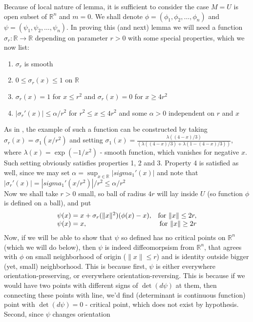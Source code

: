 \documentclass[8pt]{article} %
\newcommand{\norm}[1]{\|#1\|}
\newenvironment{proof}[1][Proof]{\begin{trivlist}
\item[\hskip \labelsep {\bfseries #1}]}{\qed\end{trivlist}}
\newcommand{\qed}{\nobreak \ifvmode \relax \else
\ifdim\lastskip<1.5em \hskip-\lastskip
\hskip1.5em plus0em minus0.5em \fi \nobreak
  \vrule height0.75em width0.5em depth0.25em\fi}
\begin{document}
\begin{proof}
	Because of local nature of lemma, it is sufficient to consider the case $M=U$ is open subset of $\mathbb{R}^n$ and $m=0$. We shall denote $\phi=(\phi_1,\phi_2,\dots,\phi_n)$ and $\psi=(\psi_1,\psi_2,\dots,\psi_n)$.
	In proving this (and next) lemma we will need a function $\sigma_r:\mathbb{R}\rightarrow\mathbb{R}$
	depending on parameter $r>0$
with some special properties, which we now list:
\begin{enumerate}\label{sigma_r_prop}
	\item{$\sigma_r$ is smooth}
	\item{$0\leq \sigma_r(x)\leq 1$ on $\mathbb{R}$}
	\item{$\sigma_r(x)=1$ for $x\leq r^2$ and $\sigma_r(x)=0$ for $x\geq 4r^2$}
	\item{$|\sigma_r'(x)|\leq \alpha/r^2$ for $r^2\leq x\leq 4r^2$ and some $\alpha>0$ independent on $r$ and $x$}
\end{enumerate}
As in \cite{diffTopo}, the example of such a function can be constructed by taking $\sigma_r(x)=\sigma_1(x/r^2)$ and setting $\sigma_1(x)=
\frac{\lambda((4-x)/3)}{(\lambda((4-x)/3)+\lambda(1-(4-x)/3))}$,
where $\lambda(x)=\exp(-1/x^2)$ - smooth function, which
vanishes for negative $x$. Such setting obviously satisfies properties 1, 2 and 3. Property 4 is satisfied as well, since we may set $\alpha=\sup_{x\in\mathbb{R}} |sigma_1'(x)|$ and note 
that $|\sigma_r'(x)|=|sigma_1'(x/r^2)|/r^2\leq \alpha/r^2$\\
Now we shall take $r>0$ small, so ball of radius $4r$ will lay inside $U$ (so function $\phi$ is defined on a ball), and put
\[\begin{array}{l r}
	\psi(x)=x+\sigma_{r}(\norm{x}^2)(\phi(x)-x), & \mbox{for }\norm{x}\leq 2r,\\
	\psi(x)=x, & \mbox{for }\norm{x}\geq 2r\\
\end{array}\]
Now, if we will be able to show that $\psi$ so defined has no critical points on $\mathbb{R}^n$ (which we will do below), then $\psi$ is
indeed diffeomorpsism from $\mathbb{R}^n$, that agrees with $\phi$ on small neighborhood of origin ($\norm{x}\leq r$) and is identity outside bigger
(yet, small) neighborhood. This is because first, $\psi$ is either everywhere orientation-preserving, or everywhere orientation-reversing. This
is because if we would have two points with different signs of $\det (d\psi)$ at them, then connecting these points with line, we'd find (determinant
is continuous function) point with $\det (d\psi)=0$ - critical point, which does not exist by hypothesis. Second, since $\psi$ changes orientation

\end{proof}
\end{document}
